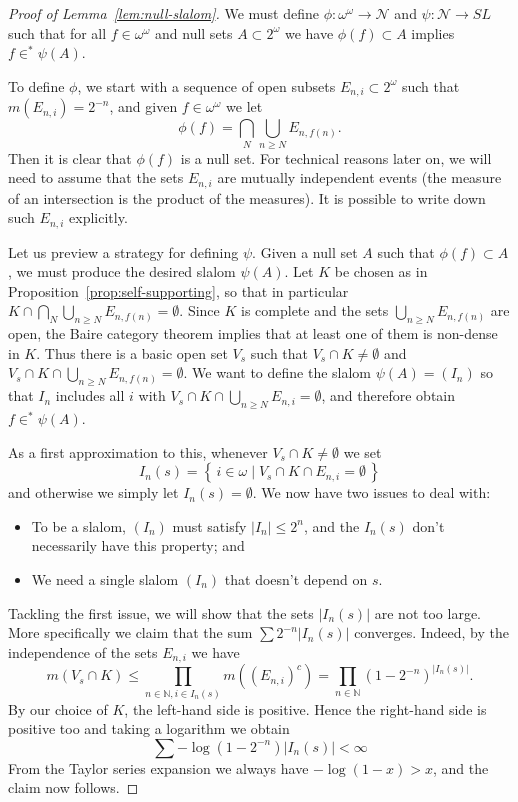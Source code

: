 \documentclass[11pt,oneside]{amsbook}
\newcommand{\set}[1]{\left\{\,#1\,\right\}}
\newcommand{\N}{\mathbb N}
\newcommand{\Null}{\mathcal N}
\theoremstyle{definition}
\theoremstyle{plain}
\theoremstyle{definition}
\theoremstyle{remark}
\numberwithin{equation}{section}
\numberwithin{figure}{section}
\begin{document}
\begin{proof}[Proof of Lemma~\ref{lem:null-slalom}]
  We must define $\phi\colon\omega^\omega\to\Null$ and $\psi\colon\Null\to SL$ such that for all $f\in\omega^\omega$ and null sets $A\subset2^\omega$ we have $\phi(f)\subset A$ implies $f\in^*\psi(A)$.

  To define $\phi$, we start with a sequence of open subsets $E_{n,i}\subset2^\omega$ such that $m(E_{n,i})=2^{-n}$, and given $f\in\omega^\omega$ we let
  \[\phi(f)=\bigcap_N\bigcup_{n\geq N} E_{n,f(n)}\text{.}
  \]
  Then it is clear that $\phi(f)$ is a null set. For technical reasons later on, we will need to assume that the sets $E_{n,i}$ are mutually independent events (the measure of an intersection is the product of the measures). It is possible to write down such $E_{n,i}$ explicitly.

  Let us preview a strategy for defining $\psi$. Given a null set $A$ such that $\phi(f)\subset A$, we must produce the desired slalom $\psi(A)$. Let $K$ be chosen as in Proposition~\ref{prop:self-supporting}, so that in particular $K\cap\bigcap_N\bigcup_{n\geq N}E_{n,f(n)}=\emptyset$. Since $K$ is complete and the sets $\bigcup_{n\geq N}E_{n,f(n)}$ are open, the Baire category theorem implies that at least one of them is non-dense in $K$. Thus there is a basic open set $V_s$ such that $V_s\cap K\neq\emptyset$ and $V_s\cap K\cap\bigcup_{n\geq N}E_{n,f(n)}=\emptyset$. We want to define the slalom $\psi(A)=(I_n)$ so that $I_n$ includes all $i$ with $V_s\cap K\cap\bigcup_{n\geq N}E_{n,i}=\emptyset$, and therefore obtain $f\in^*\psi(A)$.

  As a first approximation to this, whenever $V_s\cap K\neq\emptyset$ we set
  \[I_n(s)=\set{i\in\omega\mid V_s\cap K\cap E_{n,i}=\emptyset}
  \]
  and otherwise we simply let $I_n(s)=\emptyset$. We now have two issues to deal with:
  \begin{itemize}
    \item To be a slalom, $(I_n)$ must satisfy $|I_n|\leq2^n$, and the $I_n(s)$ don't necessarily have this property; and
    \item We need a single slalom $(I_n)$ that doesn't depend on $s$.
  \end{itemize}

  Tackling the first issue, we will show that the sets $|I_n(s)|$ are not too large. More specifically we claim that the sum $\sum2^{-n}|I_n(s)|$ converges. Indeed, by the independence of the sets $E_{n,i}$ we have
  \[m(V_s\cap K)\leq\prod_{n\in\N,i\in I_n(s)}m((E_{n,i})^c)
  =\prod_{n\in\N}(1-2^{-n})^{|I_n(s)|}\text{.}
  \]
  By our choice of $K$, the left-hand side is positive. Hence the right-hand side is positive too and taking a logarithm we obtain
  \[\sum-\log(1-2^{-n})|I_n(s)|<\infty
  \]
  From the Taylor series expansion we always have $-\log(1-x)>x$, and the claim now follows.


\end{proof}
\end{document}
